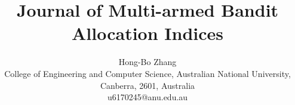 \documentclass[11pt,note]{HONGBOANU}
\title{Journal of Multi-armed Bandit Allocation Indices}
\author{Hong-Bo Zhang\\
College of Engineering and Computer Science, Australian National University, Canberra, 2601, Australia\\
u6170245@anu.edu.au}
\begin{document}
\newpage




\acknowledgments

\appendix


\begin{thebibliography}{999}
\end{thebibliography}
\end{document}
